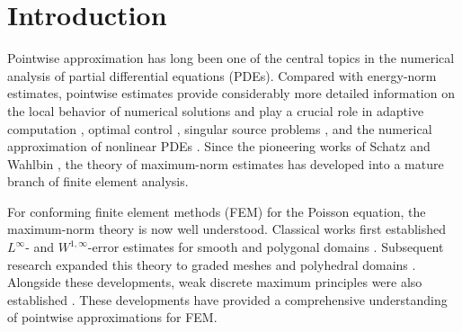 \documentclass[1996/10/24]{amsart}
\theoremstyle{definition}
\numberwithin{equation}{section}
\begin{document}
\begin{abstract}
Via the proposed framework, we establish optimal error estimates in the complete discrete $W^{1,\infty}$ norm for the symmetric interior penalty DG method, the hybrid mixed DG method, and two representative hybridizable DG methods
for the Poisson equation in convex polyhedral domains.
In particular, we derive optimal maximum-norm estimates for interface jumps, numerical fluxes, and broken gradients.
We further extend the framework to the $C^0$ interior penalty method for the biharmonic equation on convex polygonal
domains and obtain maximum-norm estimates for the jumps of the normal derivative. The interface Green's function
framework is sufficiently general to be applicable to a broad class of nonconforming methods and is valid on general
polyhedral meshes.
\end{abstract}



\maketitle

\section{Introduction}

Pointwise approximation has long been one of the central topics in the numerical analysis of partial differential equations (PDEs). Compared with energy-norm estimates, pointwise estimates provide considerably more detailed information on the local behavior of numerical solutions and play a crucial role in adaptive computation \cite{dg2012, nssv2006}, optimal control \cite{dh2007, lc2026}, singular source problems \cite{ddo2020}, and the numerical approximation of nonlinear PDEs \cite{d2006, dd1975}. Since the pioneering works of Schatz and Wahlbin \cite{sw1978,sw1995}, the theory of maximum-norm estimates has developed into a mature branch of finite element analysis.

For conforming finite element methods (FEM) for the Poisson equation, the maximum-norm theory is now 
well understood. Classical works first established $L^\infty$- and $W^{1,\infty}$-error estimates for smooth \cite{sw1995} and polygonal domains \cite{sw1978}. Subsequent research expanded this theory to graded meshes \cite{dlsw2012} and polyhedral domains \cite{drs2024, glrs2009}. Alongside these developments, weak discrete maximum principles were also established \cite{s1980, ll2020}. These developments have provided a comprehensive understanding of pointwise approximations for FEM.
\end{document}
